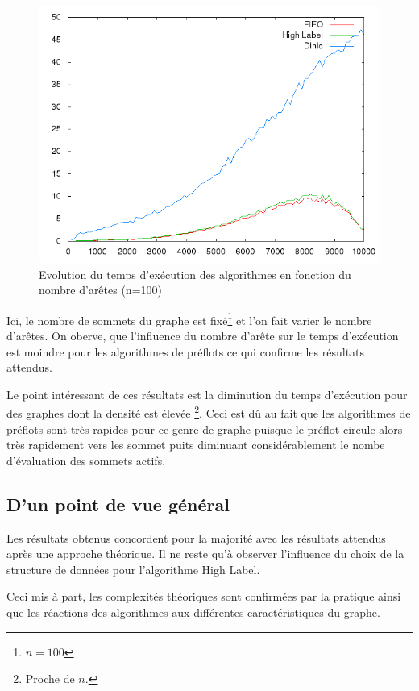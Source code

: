 \begin{figure}
	\begin{center}
		\includegraphics[scale=0.6]{../data_struct/results/result_arete.png}
	\end{center}
	\caption{Evolution du temps d'exécution des algorithmes en fonction du nombre d'arêtes (n=100)}
	\label{res_arete}
\end{figure}

Ici, le nombre de sommets du graphe est fixé\footnote{$n=100$} et l'on fait varier le nombre
d'arêtes. On oberve, que l'influence du nombre d'arête sur le temps d'exécution est moindre pour les
algorithmes de préflots ce qui confirme les résultats attendus.

Le point intéressant de ces résultats est la diminution du temps d'exécution pour des graphes dont
la densité est élevée \footnote{Proche de $n$.}. Ceci est dû au fait que les algorithmes de préflots
sont très rapides pour ce genre de graphe puisque le préflot circule alors très rapidement vers les
sommet puits diminuant considérablement le nombe d'évaluation des sommets actifs.

\subsection{D'un point de vue général}

Les résultats obtenus concordent pour la majorité avec les résultats attendus après une approche
théorique. Il ne reste qu'à observer l'influence du choix de la structure de données pour
l'algorithme High Label. 

Ceci mis à part, les complexités théoriques sont confirmées par la pratique ainsi que les réactions
des algorithmes aux différentes caractéristiques du graphe.
